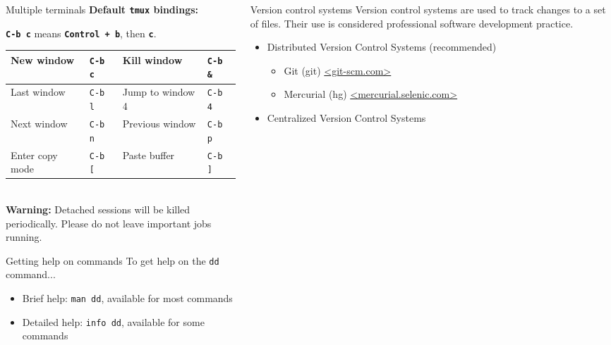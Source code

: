 \documentclass{beamer}
\newcommand{\command}[1]{\textbf{\texttt{#1}}}
\begin{document}
\begin{frame}[fragile]{}
\begin{columns}[T]
\begin{column}{0.33\textwidth}
\begin{block}{Multiple terminals}
        \textbf{Default \texttt{tmux} bindings:} \\
        {\newcommand{\key}[1]{\texttt{C-b #1}}
          \textbf{\key{c}} means \command{Control + b}, then \command{c}.
          \begin{tabu} to 0.9\linewidth { X[2] X X[2] X }
            \hline
            New window & \key{c} & Kill window & \key{\&} \\ \hline
            Last window & \key{l} & Jump to window 4 & \key{4} \\ \hline
            Next window & \key{n} & Previous window & \key{p} \\ \hline
            Enter copy mode & \key{[} & Paste buffer & \key{]} \\ \hline
          \end{tabu} \\[0.5em]
          \textbf{Warning:} Detached sessions will be killed periodically. Please do not leave important jobs running.
        }
      \end{block}
      \begin{block}{Getting help on commands}
        To get help on the \texttt{dd} command...
        \begin{itemize}
        \item Brief help: \texttt{man dd}, available for most commands
        \item Detailed help: \texttt{info dd}, available for some commands
        \end{itemize}
      \end{block}
    \end{column}
    \begin{column}{0.33\textwidth}
      \begin{block}{Version control systems}
        Version control systems are used to track changes to a set of files. Their use is considered professional software development practice.
        \begin{itemize}
        \item Distributed Version Control Systems (recommended)
          \begin{itemize}
          \item Git (git) \url{<git-scm.com>}
          \item Mercurial (hg) \url{<mercurial.selenic.com>}
          \end{itemize}
        \item Centralized Version Control Systems
          \begin{itemize}

\end{itemize}
\end{itemize}
\end{block}
\end{column}
\end{columns}
\end{frame}
\end{document}
